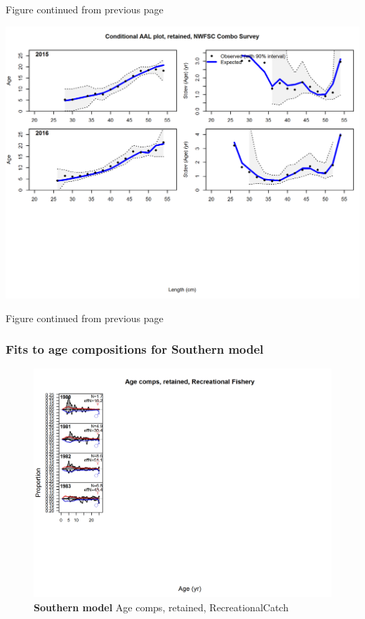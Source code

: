 \documentclass[12pt,]{article}
\begin{document}
\begin{center} 

            Figure continued from previous page 

            \end{center}

\includegraphics{./r4ss/plots_mod1/comp_condAALfit_Andre_plotsflt6mkt2_page5.png}

\begin{center} 

            Figure continued from previous page 

            \end{center}

\FloatBarrier

\newpage

\subsubsection{Fits to age compositions for Southern
model}\label{fits-to-age-compositions-for-southern-model}

\begin{figure}[htbp]
\centering
\includegraphics{./r4ss/plots_mod2/comp_agefit_flt1mkt2.png}
\caption{\textbf{Southern model} Age comps, retained, RecreationalCatch
\label{fig:mod2_1_comp_agefit_flt1mkt2}}
\end{figure}
\end{document}
